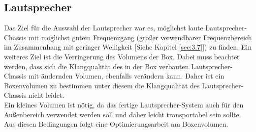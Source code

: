 \subsection{Lautsprecher}\label{subsec:2.1.2}
Das Ziel für die Auswahl der Lautsprecher war es, möglichst laute Lautsprecher-Chassis mit möglichst gutem Frequenzgang (großer verwendbarer Frequenzbereich im Zusammenhang mit geringer Welligkeit [Siehe Kapitel \ref{sec:3.7}]) zu finden.
Ein weiteres Ziel ist die Verringerung des Volumens der Box.
Dabei muss beachtet werden, dass sich die Klangqualität des in der Box verbauten Lautsprecher-Chassis mit ändernden Volumen, ebenfalls verändern kann.
Daher ist ein Boxenvolumen zu bestimmen unter diesem die Klangqualität des Lautsprecher-Chassis nicht leidet.\\
Ein kleines Volumen ist nötig, da das fertige Lautsprecher-System auch für den Außenbereich verwendet werden soll und daher leicht transportabel sein sollte.
Aus diesen Bedingungen folgt eine Optimierungsarbeit am Boxenvolumen.
